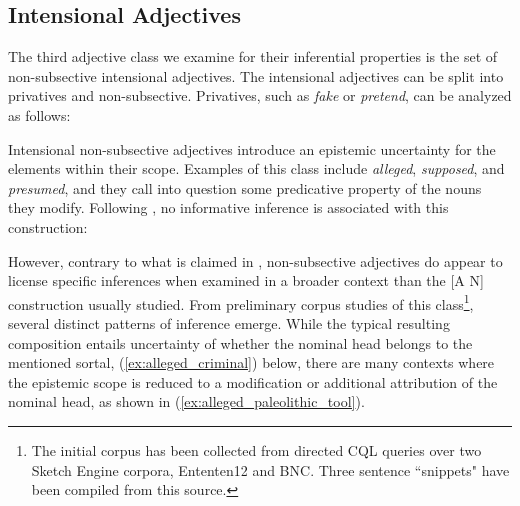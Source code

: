 \documentclass[10pt]{article}
\begin{document}
\subsection{Intensional Adjectives}
The third adjective class we examine for their inferential properties is the set of non-subsective intensional adjectives. 
% 
% 
%
The intensional adjectives can be split into privatives and non-subsective. 
Privatives, such as {\it fake} or {\it pretend}, can be analyzed as follows:
\vspace{-0.5em}
\vspace{-0.5em}

\noindent
Intensional non-subsective adjectives introduce an epistemic uncertainty for the elements within their scope. 
Examples of  this class include \emph{alleged},
\emph{supposed}, and \emph{presumed}, and they call 
into question some predicative property of the nouns they modify. Following \cite{Kamp95prototypetheory}, no informative inference is associated with this construction:
\vspace{-.5em}
\vspace{-0.5em}

\noindent However, contrary to what is claimed in \cite{amoia2006adjective}, non-subsective adjectives do appear to license specific inferences when examined in a broader context than the [A N] construction usually studied. From preliminary corpus studies of this class\footnote{The initial corpus has been collected from directed CQL queries over  two Sketch Engine corpora, Ententen12 and BNC. Three sentence ``snippets" have been compiled from this source.}, several distinct patterns of inference emerge. While the typical resulting composition entails  uncertainty of 
 whether the nominal head belongs to the mentioned sortal, (\ref{ex:alleged_criminal}) below, there are many contexts where the epistemic scope is reduced to  a modification or additional attribution of the nominal head, as shown in  (\ref{ex:alleged_paleolithic_tool}). 

\vspace{-0.5em}
\vspace{-0.5em}
\end{document}
